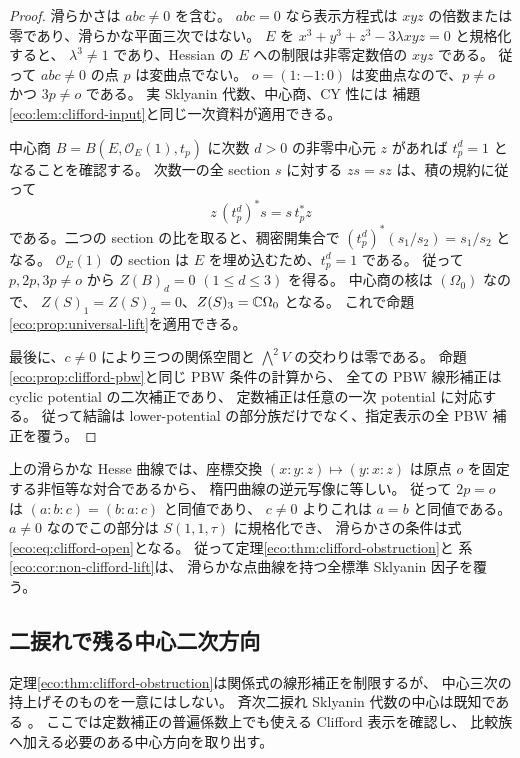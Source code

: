 \begin{proof}
滑らかさは $abc\ne0$ を含む。
$abc=0$ なら表示方程式は $xyz$ の倍数または零であり、滑らかな平面三次ではない。
$E$ を $x^3+y^3+z^3-3\lambda xyz=0$ と規格化すると、
$\lambda^3\ne1$ であり、Hessian の $E$ への制限は非零定数倍の $xyz$ である。
従って $abc\ne0$ の点 $p$ は変曲点でない。
$o=(1:-1:0)$ は変曲点なので、$p\ne o$ かつ $3p\ne o$ である。
実 Sklyanin 代数、中心商、CY 性には
補題\ref{eco:lem:clifford-input}と同じ一次資料が適用できる。

中心商 $B=B(E,\mathcal O_E(1),t_p)$ に次数 $d>0$ の非零中心元 $z$ があれば
$t_p^d=1$ となることを確認する。
次数一の全 section $s$ に対する $zs=sz$ は、積の規約に従って
\[
             z\,(t_p^d)^*s=s\,t_p^*z
\]
である。二つの section の比を取ると、稠密開集合で
$(t_p^d)^*(s_1/s_2)=s_1/s_2$ となる。
$\mathcal O_E(1)$ の section は $E$ を埋め込むため、$t_p^d=1$ である。
従って $p,2p,3p\ne o$ から $Z(B)_d=0$ $(1\le d\le3)$ を得る。
中心商の核は $(\Omega_0)$ なので、
$Z(S)_1=Z(S)_2=0$、$Z(S)_3=\mathbb C\Omega_0$ となる。
これで命題\ref{eco:prop:universal-lift}を適用できる。

最後に、$c\ne0$ により三つの関係空間と $\bigwedge^2V$ の交わりは零である。
命題\ref{eco:prop:clifford-pbw}と同じ PBW 条件の計算から、
全ての PBW 線形補正は cyclic potential の二次補正であり、
定数補正は任意の一次 potential に対応する。
従って結論は lower-potential の部分族だけでなく、指定表示の全 PBW 補正を覆う。
\end{proof}

\begin{remark}
\label{eco:rem:exhaustion}
上の滑らかな Hesse 曲線では、座標交換
$(x:y:z)\mapsto(y:x:z)$ は原点 $o$ を固定する非恒等な対合であるから、
楕円曲線の逆元写像に等しい。
従って $2p=o$ は $(a:b:c)=(b:a:c)$ と同値であり、
$c\ne0$ よりこれは $a=b$ と同値である。
$a\ne0$ なのでこの部分は $S(1,1,\tau)$ に規格化でき、
滑らかさの条件は式\eqref{eco:eq:clifford-open}となる。
従って定理\ref{eco:thm:clifford-obstruction}と
系\ref{eco:cor:non-clifford-lift}は、
滑らかな点曲線を持つ全標準 Sklyanin 因子を覆う。
\end{remark}

\subsection{二捩れで残る中心二次方向}

定理\ref{eco:thm:clifford-obstruction}は関係式の線形補正を制限するが、
中心三次の持上げそのものを一意にはしない。
斉次二捩れ Sklyanin 代数の中心は既知である
\cite[Theorem~7.1(a)]{CMOReichWaltonOrderTwo}。
ここでは定数補正の普遍係数上でも使える Clifford 表示を確認し、
比較族へ加える必要のある中心方向を取り出す。

